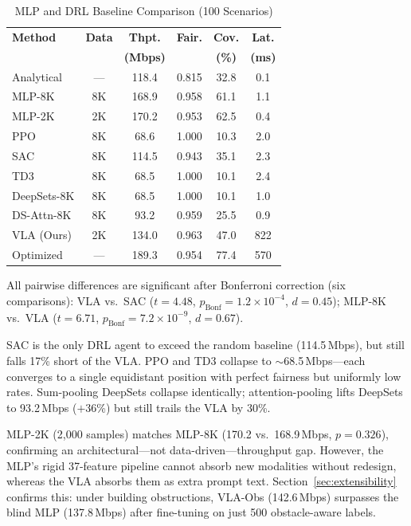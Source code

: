 \documentclass[journal]{IEEEtran}
\begin{document}
\begin{table}[!t]
    \centering
    \caption{MLP and DRL Baseline Comparison (100 Scenarios)}
    \label{tab:mlp_drl}
    \small
    \begin{tabular}{l@{\hskip 5pt}c@{\hskip 5pt}c@{\hskip 5pt}c@{\hskip 5pt}c@{\hskip 5pt}c}
        \toprule
        \textbf{Method} & \textbf{Data} & \textbf{Thpt.} & \textbf{Fair.} & \textbf{Cov.} & \textbf{Lat.} \\
        & & \textbf{(Mbps)} & & \textbf{(\%)} & \textbf{(ms)} \\
        \midrule
        Analytical & --- & 118.4 & 0.815 & 32.8 & 0.1 \\
        MLP-8K & 8K & 168.9 & 0.958 & 61.1 & 1.1 \\
        MLP-2K & 2K & 170.2 & 0.953 & 62.5 & 0.4 \\
        PPO & 8K & 68.6 & 1.000 & 10.3 & 2.0 \\
        SAC & 8K & 114.5 & 0.943 & 35.1 & 2.3 \\
        TD3 & 8K & 68.5 & 1.000 & 10.1 & 2.4 \\
        DeepSets-8K & 8K & 68.5 & 1.000 & 10.1 & 1.0 \\
        DS-Attn-8K & 8K & 93.2 & 0.959 & 25.5 & 0.9 \\
        VLA (Ours) & 2K & 134.0 & 0.963 & 47.0 & 822 \\
        Optimized & --- & 189.3 & 0.954 & 77.4 & 570 \\
        \bottomrule
    \end{tabular}
\end{table}

All pairwise differences are significant after Bonferroni correction (six comparisons): VLA vs.\ SAC ($t{=}4.48$, $p_\text{Bonf}{=}1.2{\times}10^{-4}$, $d{=}0.45$); MLP-8K vs.\ VLA ($t{=}6.71$, $p_\text{Bonf}{=}7.2{\times}10^{-9}$, $d{=}0.67$).

SAC is the only DRL agent to exceed the random baseline (114.5\,Mbps), but still falls 17\% short of the VLA. PPO and TD3 collapse to ${\sim}$68.5\,Mbps---each converges to a single equidistant position with perfect fairness but uniformly low rates. Sum-pooling DeepSets collapse identically; attention-pooling lifts DeepSets to 93.2\,Mbps ($+$36\%) but still trails the VLA by 30\%.

MLP-2K (2{,}000 samples) matches MLP-8K (170.2 vs.\ 168.9\,Mbps, $p{=}0.326$), confirming an architectural---not data-driven---throughput gap. However, the MLP's rigid 37-feature pipeline cannot absorb new modalities without redesign, whereas the VLA absorbs them as extra prompt text. Section~\ref{sec:extensibility} confirms this: under building obstructions, VLA-Obs (142.6\,Mbps) surpasses the blind MLP (137.8\,Mbps) after fine-tuning on just 500 obstacle-aware labels.
\end{document}
